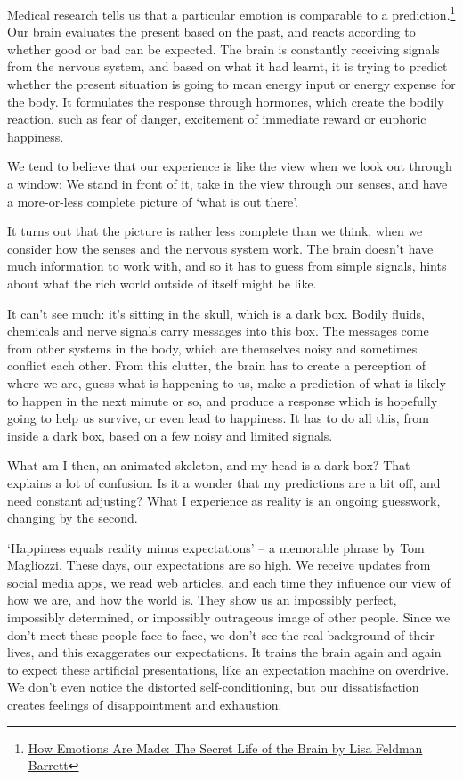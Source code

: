 Medical research tells us that a particular emotion is comparable to a
prediction.\footnote{\href{https://www.goodreads.com/book/show/23719305-how-emotions-are-made}{How
  Emotions Are Made: The Secret Life of the Brain by Lisa Feldman
  Barrett}} Our brain evaluates the present based on the past, and
reacts according to whether good or bad can be expected. The brain is
constantly receiving signals from the nervous system, and based on what
it had learnt, it is trying to predict whether the present situation is
going to mean energy input or energy expense for the body. It formulates
the response through hormones, which create the bodily reaction, such as
fear of danger, excitement of immediate reward or euphoric happiness.

We tend to believe that our experience is like the view when we look out
through a window: We stand in front of it, take in the view through our
senses, and have a more-or-less complete picture of `what is out there'.

It turns out that the picture is rather less complete than we think,
when we consider how the senses and the nervous system work. The brain
doesn't have much information to work with, and so it has to guess from
simple signals, hints about what the rich world outside of itself might
be like.

It can't see much: it's sitting in the skull, which is a dark box.
Bodily fluids, chemicals and nerve signals carry messages into this box.
The messages come from other systems in the body, which are themselves
noisy and sometimes conflict each other. From this clutter, the brain
has to create a perception of where we are, guess what is happening to
us, make a prediction of what is likely to happen in the next minute or
so, and produce a response which is hopefully going to help us survive,
or even lead to happiness. It has to do all this, from inside a dark
box, based on a few noisy and limited signals.

What am I then, an animated skeleton, and my head is a dark box? That
explains a lot of confusion. Is it a wonder that my predictions are a
bit off, and need constant adjusting? What I experience as reality is an
ongoing guesswork, changing by the second.

`Happiness equals reality minus expectations' -- a memorable phrase by
Tom Magliozzi. These days, our expectations are so high. We receive
updates from social media apps, we read web articles, and each time they
influence our view of how we are, and how the world is. They show us an
impossibly perfect, impossibly determined, or impossibly outrageous
image of other people. Since we don't meet these people face-to-face, we
don't see the real background of their lives, and this exaggerates our
expectations. It trains the brain again and again to expect these
artificial presentations, like an expectation machine on overdrive. We
don't even notice the distorted self-conditioning, but our
dissatisfaction creates feelings of disappointment and exhaustion.

